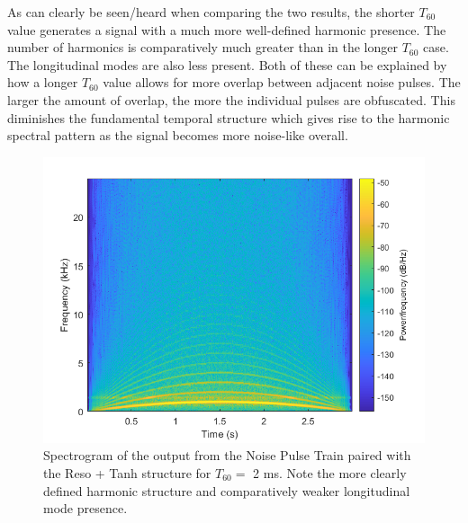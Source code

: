 \documentclass[../main.tex]{subfiles}
\begin{document}
As can clearly be seen/heard when comparing the two results, the shorter $T_{60}$ value generates a signal with a much more well-defined harmonic presence. The number of harmonics is comparatively much greater than in the longer $T_{60}$ case. The longitudinal modes are also less present. Both of these can be explained by how a longer $T_{60}$ value allows for more overlap between adjacent noise pulses. The larger the amount of overlap, the more the individual pulses are obfuscated. This diminishes the fundamental temporal structure which gives rise to the harmonic spectral pattern as the signal becomes more noise-like overall.

\begin{figure}[!]
    \centering
    \includegraphics[scale=.60]{./images/plots/NPTResoTanhT60Short.png}
    \caption{Spectrogram of the output from the Noise Pulse Train paired with the Reso + Tanh structure for $T_{60} = $ 2 ms. Note the more clearly defined harmonic structure and comparatively weaker longitudinal mode presence.}
    \label{fig:NPT_RT_T60_Short}
\end{figure}
\end{document}
